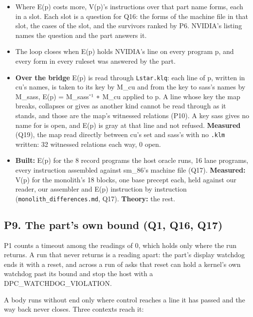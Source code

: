 \begin{itemize}
\item Where E(p) costs more, V(p)'s instructions over that part name forms, each in a slot. Each slot is a question for Q16: the forms of the machine file in that slot, the cases of the slot, and the survivors ranked by P6. NVIDIA's listing names the question and the part answers it.
\item The loop closes when E(p) holds NVIDIA's line on every program p, and every form in every ruleset was answered by the part.
\item \textbf{Over the bridge} E(p) is read through \texttt{Lstar.\allowbreak{}klq}: each line of p, written in cu's names, is taken to its key by M\_\allowbreak{}cu and from the key to sass's names by M\_\allowbreak{}sass, E(p) = M\_\allowbreak{}sass⁻¹ ∘ M\_\allowbreak{}cu applied to p. A line whose key the map breaks, collapses or gives as another kind cannot be read through as it stands, and those are the map's witnessed relations (P10). A key sass gives no name for is open, and E(p) is gray at that line and not refused. \textbf{Measured} (Q19), the map read directly between cu's set and sass's with no \texttt{.\allowbreak{}klm} written: 32 witnessed relations each way, 0 open.
\item \textbf{Built:} E(p) for the 8 record programs the host oracle runs, 16 lane programs, every instruction assembled against sm\_\allowbreak{}86's machine file (Q17). \textbf{Measured:} V(p) for the monolith's 18 blocks, one base precept each, held against our reader, our assembler and E(p) instruction by instruction (\texttt{monolith\_\allowbreak{}differences.\allowbreak{}md}, Q17). \textbf{Theory:} the rest.
\end{itemize}

\subsection{\texorpdfstring{P9. The part's own bound (Q1, Q16, Q17)}{P9. The part's own bound (Q1, Q16, Q17)}}

P1 counts a timeout among the readings of 0, which holds only where the run returns. A run that never returns is a reading apart: the part's display watchdog ends it with a reset, and across a run of asks that reset can hold a kernel's own watchdog past its bound and stop the host with a DPC\_\allowbreak{}WATCHDOG\_\allowbreak{}VIOLATION.

A body runs without end only where control reaches a line it has passed and the way back never closes. Three contexts reach it:

